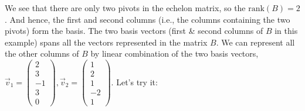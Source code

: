 \documentclass[conference,final,11pt,technote,onecolumn]{IEEEtran}\usepackage[]{graphicx}\usepackage[]{color}
\begin{document}
We see that there are only two pivots in the echelon matrix, so the $\text{rank}(B) = 2$. And hence, the first and second columns (i.e., the columns containing the two pivots) form the basis. The two basis vectors (first \& second columns of $B$ in this example) spans all the vectors represented in the matrix $B$. We can represent all the other columns of $B$ by linear combination of the two basis vectors, $\vec v_1=\begin{pmatrix}2\\3\\-1\\3\\0\end{pmatrix}, \vec v_2=\begin{pmatrix}1\\2\\1\\-2\\1\end{pmatrix}$. Let's try it:
\end{document}
